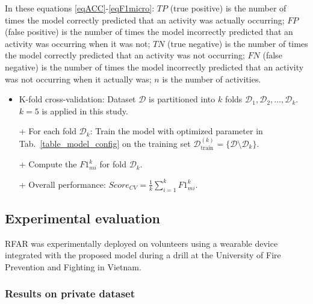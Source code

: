 \documentclass[journal,twoside,web]{ieeecolor}
\begin{document}
In these equations \ref{eqACC}-\ref{eqF1micro}: $TP$ (true positive) is the number of times the model correctly predicted that an activity was actually occurring; $FP$ (false positive) is the number of times the model incorrectly predicted that an activity was occurring when it was not; $TN$ (true negative) is the number of times the model correctly predicted that an activity was not occurring; $FN$ (false negative) is the number of times the model incorrectly predicted that an activity was not occurring when it actually was; $n$ is the number of activities.

\begin{itemize}
    \item K-fold cross-validation: Dataset $\mathcal{D}$ is partitioned into $k$ folds $\mathcal{D}_1, \mathcal{D}_2, \ldots, \mathcal{D}_k$. $k=5$ is applied in this study.
    
   + For each fold $\mathcal{D}_k$: Train the model with optimized parameter in Tab.~\ref{table_model_config} on the training set $\mathcal{D}_{\text{train}}^{(k)} = \{\mathcal{D} \setminus \mathcal{D}_k\}$.
    
    + Compute the $F1_{mi}^{k}$  for fold $\mathcal{D}_k$.
    
    + Overall performance: $Score_{CV}=\frac{1}{k} \sum_{i=1}^{k}F1_{mi}^{k}$.

\end{itemize}


\subsection{Experimental evaluation}

RFAR was experimentally deployed on volunteers using a wearable device integrated with the proposed model during a drill at the University of Fire Prevention and Fighting in Vietnam.
\subsubsection{Results on private dataset}
\end{document}
